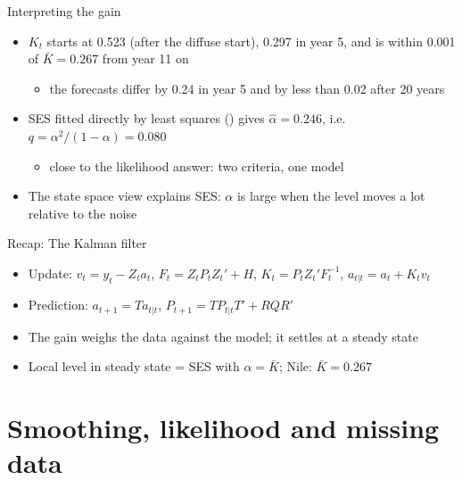 \begin{frame}{Interpreting the gain}
\itemsize{\small}
\begin{itemize}
    \item $K_t$ starts at 0.523 (after the diffuse start), 0.297 in year 5, and is within 0.001 of $\bar K = 0.267$ from year 11 on
    \begin{itemize}
        \item the forecasts differ by 0.24 in year 5 and by less than 0.02 after 20 years
    \end{itemize}
    \item SES fitted directly by least squares () gives $\hat\alpha = 0.246$, i.e.\ $q = \alpha^2/(1-\alpha) = 0.080$
    \begin{itemize}
        \item close to the likelihood answer: two criteria, one model
    \end{itemize}
    \item The state space view explains SES: $\alpha$ is large when the level moves a lot relative to the noise
\end{itemize}
\end{frame}

\begin{frame}{Recap: The Kalman filter}
\itemsize{\small}
\begin{itemize}
    \item Update: $v_t = y_t - Z_ta_t$, $F_t = Z_tP_tZ_t' + H$, $K_t = P_tZ_t'F_t^{-1}$, $a_{t|t} = a_t + K_tv_t$
    \item Prediction: $a_{t+1} = Ta_{t|t}$, $P_{t+1} = TP_{t|t}T' + RQR'$
    \item The gain weighs the data against the model; it settles at a steady state
    \item Local level in steady state = SES with $\alpha = \bar K$; Nile: $\bar K = 0.267$
\end{itemize}
\end{frame}


\section{Smoothing, likelihood and missing data}

